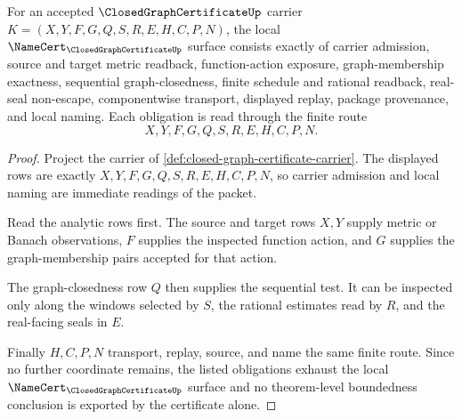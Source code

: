 \begin{theorem}
\label{thm:closed-graph-certificate-namecert-obligations}
For an accepted $\ClosedGraphCertificateUp$ carrier $K=(X,Y,F,G,Q,S,R,E,H,C,P,N)$, the local $\NameCert_{\ClosedGraphCertificateUp}$ surface consists exactly of carrier admission, source and target metric readback, function-action exposure, graph-membership exactness, sequential graph-closedness, finite schedule and rational readback, real-seal non-escape, componentwise transport, displayed replay, package provenance, and local naming. Each obligation is read through the finite route
$$
X,Y,F,G,Q,S,R,E,H,C,P,N .
$$
\end{theorem}
\begin{proof}
Project the carrier of \autoref{def:closed-graph-certificate-carrier}. The displayed rows are exactly $X,Y,F,G,Q,S,R,E,H,C,P,N$, so carrier admission and local naming are immediate readings of the packet.

Read the analytic rows first. The source and target rows $X,Y$ supply metric or Banach observations, $F$ supplies the inspected function action, and $G$ supplies the graph-membership pairs accepted for that action.

The graph-closedness row $Q$ then supplies the sequential test. It can be inspected only along the windows selected by $S$, the rational estimates read by $R$, and the real-facing seals in $E$.

Finally $H,C,P,N$ transport, replay, source, and name the same finite route. Since no further coordinate remains, the listed obligations exhaust the local $\NameCert_{\ClosedGraphCertificateUp}$ surface and no theorem-level boundedness conclusion is exported by the certificate alone.
\end{proof}

